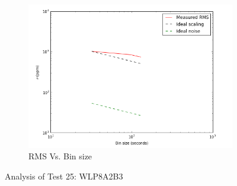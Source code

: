 \documentclass[conference]{IEEEtran}
\begin{document}
\begin{figure}[H]
    \begin{subfigure}{3}
        \includegraphics[scale=0.6]{rms_test25}
        \caption{RMS Vs. Bin size}
    \end{subfigure}
    \caption{Analysis of Test 25: WLP8A2B3}
\end{figure}
\end{document}
